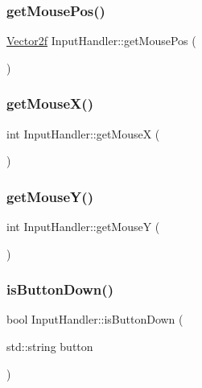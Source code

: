 \subsubsection{\texorpdfstring{getMousePos()}{getMousePos()}}
{\footnotesize\ttfamily \mbox{\hyperlink{class_vector2f}{Vector2f}} Input\+Handler\+::get\+Mouse\+Pos (\begin{DoxyParamCaption}{ }\end{DoxyParamCaption})\hspace{0.3cm}{\ttfamily [inline]}}

\mbox{\label{class_input_handler_ac44af9b426091829cd5874705cada69f}} 
\subsubsection{\texorpdfstring{getMouseX()}{getMouseX()}}
{\footnotesize\ttfamily int Input\+Handler\+::get\+MouseX (\begin{DoxyParamCaption}{ }\end{DoxyParamCaption})\hspace{0.3cm}{\ttfamily [inline]}}

\mbox{\label{class_input_handler_a060f7e3712e1361b343eae8c262e0a72}} 
\subsubsection{\texorpdfstring{getMouseY()}{getMouseY()}}
{\footnotesize\ttfamily int Input\+Handler\+::get\+MouseY (\begin{DoxyParamCaption}{ }\end{DoxyParamCaption})\hspace{0.3cm}{\ttfamily [inline]}}

\mbox{\label{class_input_handler_aacdaae99cc2949e48837d9e6bdb69169}} 
\subsubsection{\texorpdfstring{isButtonDown()}{isButtonDown()}}
{\footnotesize\ttfamily bool Input\+Handler\+::is\+Button\+Down (\begin{DoxyParamCaption}\item[{std\+::string}]{button }\end{DoxyParamCaption})}


